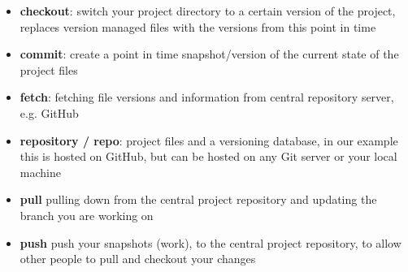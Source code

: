 \begin{itemize}[leftmargin=*]
	\item
		\textbf{checkout}:
		switch your project directory to a certain version of the project, replaces version managed files with the versions from this point in time
	\item
		\textbf{commit}:
		create a point in time snapshot/version of the current state of the project files
	\item
        \textbf{fetch}:
        fetching file versions and information from central repository server, e.g. GitHub
    \item
        \textbf{repository	 / repo}:
        project files and a versioning database, in our example this is hosted on GitHub, but can be hosted on any Git server or your local machine
    \item
    	\textbf{pull}
    	pulling down from the central project repository and updating the branch you are working on
    \item
    	\textbf{push}
    	push your snapshots (work), to the central project repository, to allow other people to pull and checkout your changes

\end{itemize}